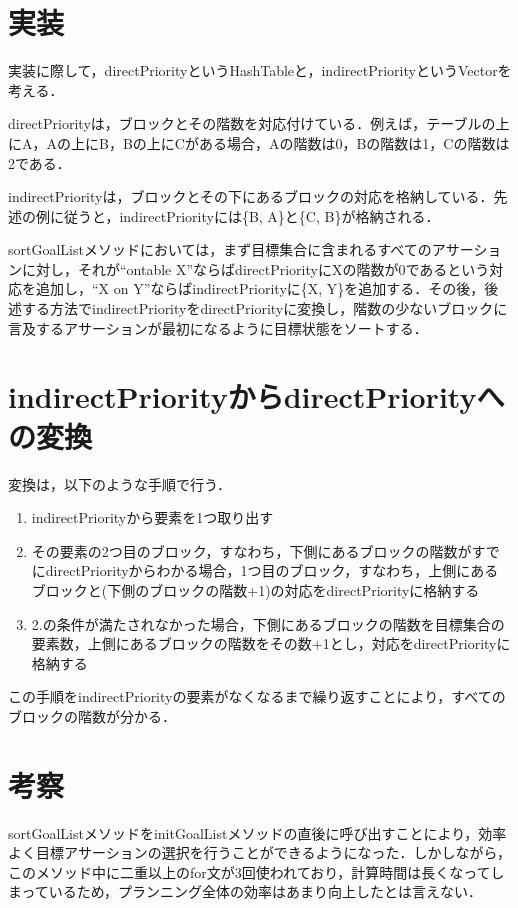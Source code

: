 \documentclass{jarticle}
\begin{document}
\section{実装}
実装に際して，directPriorityというHashTableと，indirectPriorityというVectorを考える．

directPriorityは，ブロックとその階数を対応付けている．例えば，テーブルの上にA，Aの上にB，Bの上にCがある場合，Aの階数は0，Bの階数は1，Cの階数は2である．

indirectPriorityは，ブロックとその下にあるブロックの対応を格納している．先述の例に従うと，indirectPriorityには\{B, A\}と\{C, B\}が格納される．
  
sortGoalListメソッドにおいては，まず目標集合に含まれるすべてのアサーションに対し，それが``ontable X''ならばdirectPriorityにXの階数が0であるという対応を追加し，``X on Y''ならばindirectPriorityに\{X, Y\}を追加する．その後，後述する方法でindirectPriorityをdirectPriorityに変換し，階数の少ないブロックに言及するアサーションが最初になるように目標状態をソートする．

\section{indirectPriorityからdirectPriorityへの変換}
変換は，以下のような手順で行う．
\begin{enumerate}
\item indirectPriorityから要素を1つ取り出す
\item その要素の2つ目のブロック，すなわち，下側にあるブロックの階数がすでにdirectPriorityからわかる場合，1つ目のブロック，すなわち，上側にあるブロックと(下側のブロックの階数+1)の対応をdirectPriorityに格納する
\item 2.の条件が満たされなかった場合，下側にあるブロックの階数を目標集合の要素数，上側にあるブロックの階数をその数+1とし，対応をdirectPriorityに格納する
\end{enumerate}

この手順をindirectPriorityの要素がなくなるまで繰り返すことにより，すべてのブロックの階数が分かる．

\section{考察}
sortGoalListメソッドをinitGoalListメソッドの直後に呼び出すことにより，効率よく目標アサーションの選択を行うことができるようになった．しかしながら，このメソッド中に二重以上のfor文が3回使われており，計算時間は長くなってしまっているため，プランニング全体の効率はあまり向上したとは言えない．
\end{document}

